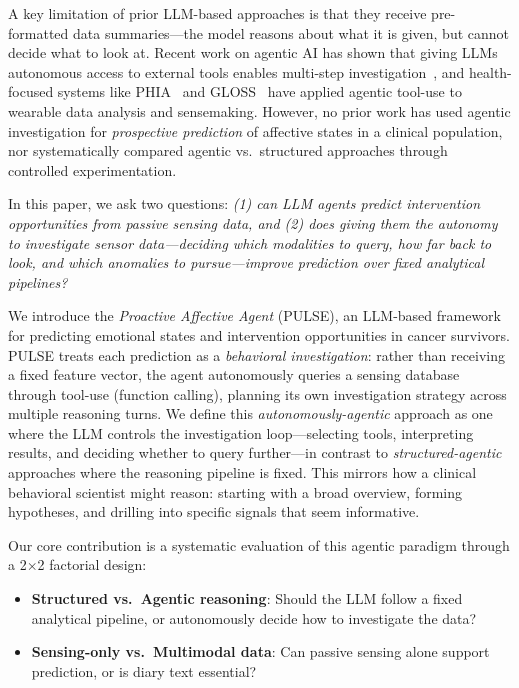 \documentclass[screen,review,anonymous]{acmart}
\newcommand{\sys}{Proactive Affective Agent}
\newcommand{\sysshort}{PULSE}
\begin{document}
A key limitation of prior LLM-based approaches is that they receive pre-formatted data summaries---the model reasons about what it is given, but cannot decide what to look at. Recent work on agentic AI has shown that giving LLMs autonomous access to external tools enables multi-step investigation~\cite{yao2023react, schick2024toolformer}, and health-focused systems like PHIA~\cite{merrill2025phia} and GLOSS~\cite{min2025gloss} have applied agentic tool-use to wearable data analysis and sensemaking. However, no prior work has used agentic investigation for \emph{prospective prediction} of affective states in a clinical population, nor systematically compared agentic vs.\ structured approaches through controlled experimentation.

In this paper, we ask two questions: \emph{(1) can LLM agents predict intervention opportunities from passive sensing data, and (2) does giving them the autonomy to investigate sensor data---deciding which modalities to query, how far back to look, and which anomalies to pursue---improve prediction over fixed analytical pipelines?}

We introduce the \emph{\sys{}} (\sysshort{}), an LLM-based framework for predicting emotional states and intervention opportunities in cancer survivors. \sysshort{} treats each prediction as a \emph{behavioral investigation}: rather than receiving a fixed feature vector, the agent autonomously queries a sensing database through tool-use (function calling), planning its own investigation strategy across multiple reasoning turns. We define this \emph{autonomously-agentic} approach as one where the LLM controls the investigation loop---selecting tools, interpreting results, and deciding whether to query further---in contrast to \emph{structured-agentic} approaches where the reasoning pipeline is fixed. This mirrors how a clinical behavioral scientist might reason: starting with a broad overview, forming hypotheses, and drilling into specific signals that seem informative.

Our core contribution is a systematic evaluation of this agentic paradigm through a 2$\times$2 factorial design:

\begin{itemize}[nosep]
    \item \textbf{Structured vs.\ Agentic reasoning}: Should the LLM follow a fixed analytical pipeline, or autonomously decide how to investigate the data?
    \item \textbf{Sensing-only vs.\ Multimodal data}: Can passive sensing alone support prediction, or is diary text essential?
\end{itemize}
\end{document}

